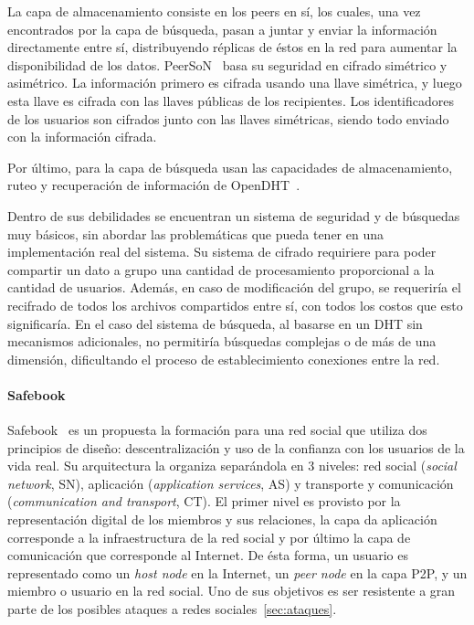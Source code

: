 La capa de almacenamiento consiste en los peers en sí, los cuales, una vez
encontrados por la capa de búsqueda, pasan a juntar y enviar la información
directamente entre sí, distribuyendo réplicas de éstos
en la red para aumentar la disponibilidad de los datos. 
PeerSoN~\cite{buchegger:peerson} basa su seguridad en cifrado simétrico y asimétrico. La
información primero es cifrada usando una llave simétrica, y luego esta
llave es cifrada con las llaves públicas de los recipientes. Los
identificadores de los usuarios son cifrados junto con las llaves
simétricas, siendo todo enviado con la información cifrada.

 Por último, para la capa de búsqueda usan las capacidades de almacenamiento,
ruteo y recuperación de información de
OpenDHT~\cite{Rhea:2005:OPD:1080091.1080102}.

Dentro de sus debilidades se encuentran un sistema de seguridad y de búsquedas
muy básicos, sin abordar las problemáticas que pueda tener en una
implementación real del sistema. Su sistema de cifrado requiriere para poder compartir
un dato a grupo una cantidad de procesamiento proporcional a la
cantidad de usuarios. Además, en caso de modificación del grupo, se requeriría
el recifrado de todos los archivos compartidos entre sí, con todos los
costos que esto significaría. En el caso del sistema de búsqueda, al basarse en
un DHT sin mecanismos adicionales, no permitiría búsquedas complejas o de más
de una dimensión, dificultando el proceso de establecimiento conexiones entre
la red.

\paragraph{Safebook}
Safebook~\cite{conf_wowmom_CutilloMO11} es un propuesta la formación para una
red social que utiliza dos principios de diseño: descentralización y uso de la
confianza con los usuarios de la vida real. Su arquitectura la organiza
separándola  en 3 niveles: red social (\textit{social network}, SN), aplicación
(\textit{application services}, AS) y transporte y comunicación
(\textit{communication and transport}, CT). El primer nivel es provisto por la
representación digital de los miembros y sus relaciones, la capa da aplicación
corresponde a la infraestructura de la red social y por último la capa de
comunicación que corresponde al Internet. 
De ésta forma, un usuario es representado como un \textit{host node} en la
Internet, un \textit{peer node} en la capa P2P, y un miembro o usuario en la
red social.
Uno de sus objetivos es ser resistente a gran parte de los posibles ataques a
redes sociales~\ref{sec:ataques}.

